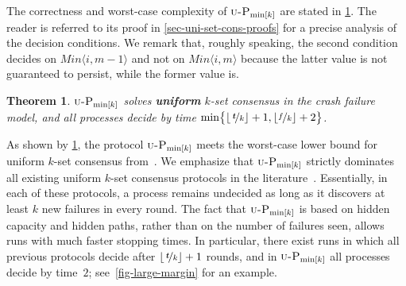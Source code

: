 \documentclass[11pt]{article}
\newtheorem{theorem}{Theorem}
\theoremstyle{definition}
\newcommand{\minval}[1]{\ensuremath{\mathit{Min}\node{#1}}}
\newcommand{\defemph}[1]{\textbf{\textit{#1}}}
\newcommand{\tee}{\,\defemph{t}}
\newcommand{\UOptMink}{\mbox{$\mbox{\sc u-P}_{\min[k]}$}}
\newcommand{\node}[1]{\langle#1\rangle}
\begin{document}
The correctness and worst-case complexity of $\UOptMink$ are stated in \cref{u-k-solve}. The reader is referred to its proof in \cref{sec-uni-set-cons-proofs}
for a precise analysis of the decision conditions. We remark  that, roughly speaking, the second condition decides on $\minval{i,m-1}$ and not on $\minval{i,m}$ because the latter value is not guaranteed to persist, while the former value is.

\begin{theorem}
\label{u-k-solve}
$\UOptMink$ solves \defemph{uniform} $k$-set consensus in the crash failure model, and all processes decide by time $\min\bigl\{\lfloor \nicefrac{\tee}{k} \rfloor+1,\lfloor \nicefrac{f}{k} \rfloor +2\bigr\}$.
\end{theorem}

As shown by \cref{u-k-solve}, the protocol $\UOptMink$ meets the worst-case lower bound
 for uniform $k$-set consensus from~\cite{GHP,AGGT}.
 We emphasize that $\UOptMink$ strictly dominates all existing
uniform $k$-set consensus protocols in the literature~\cite{CHLT,GGP,GP09,RRT}.
Essentially, in each of these protocols, a process remains undecided as long as it discovers at least $k$ new failures in every round.
The fact that $\UOptMink$ is based on hidden capacity and hidden paths, rather than on the number of failures seen,
allows runs with much faster stopping times.
In particular, there exist runs in which all previous protocols decide after $\lfloor\nicefrac{\tee}{k}\rfloor+1$ rounds, and in $\UOptMink$ all processes decide by time~$2$; see~\cref{fig-large-margin} for an example.
\end{document}
